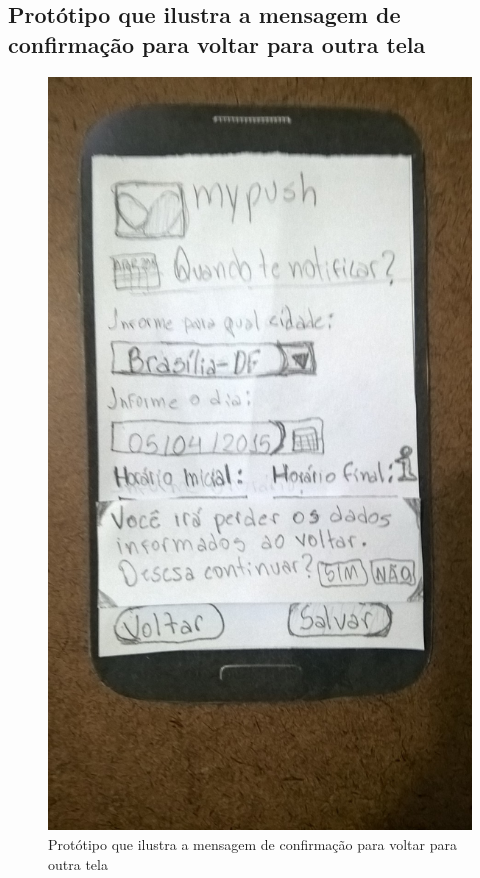 \begin{apendicesenv}
  \pagebreak
  \section*{Protótipo que ilustra a mensagem de confirmação para voltar para outra tela}

    \begin{figure}[!htbp]
      \centering
      \includegraphics[scale=0.32, angle=-90]{editaveis/figuras/prototipo_papel_v2/confirmacao_perda_dados}
      \caption{Protótipo que ilustra a mensagem de confirmação para voltar para outra tela}
      \label{confirmacao_perda_dados_v2}
    \end{figure}
    

\end{apendicesenv}
